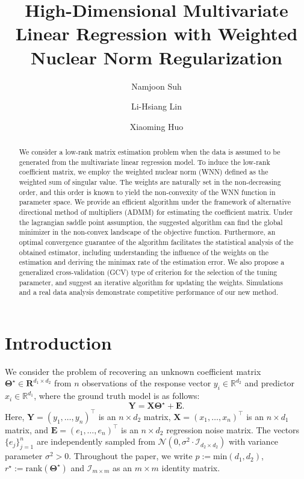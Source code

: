 \documentclass[alpha-refs]{wiley-article}
\title{High-Dimensional Multivariate Linear Regression with Weighted Nuclear Norm Regularization}
\author[1]{Namjoon Suh}
\author[2]{Li-Hsiang Lin}
\author[1]{Xiaoming Huo}
\affil[1]{H. Milton Stewart School of Industrial Systems and Engineering, Georgia Institute of Technology, Atlanta, Georgia, 30332, USA}
\affil[2]{Department of Experimental Statistics, Louisiana State University, Baton Rouge, Louisiana, 70803, USA}
\begin{document}
\maketitle

\begin{abstract}
We consider a low-rank matrix estimation problem when the data is assumed to be generated from the multivariate linear regression model.
To induce the low-rank coefficient matrix, we employ the weighted nuclear norm (WNN) defined as the weighted sum of singular value.
The weights are naturally set in the non-decreasing order, and this order is known to yield the non-convexity of the WNN function in parameter space.
We provide an efficient algorithm under the framework of alternative directional method of multipliers (ADMM) for estimating the coefficient matrix.
Under the lagrangian saddle point assumption, the suggested algorithm can find the global minimizer in the non-convex landscape of the objective function.
Furthermore, an optimal convergence guarantee of the algorithm facilitates the statistical analysis of the obtained estimator, including understanding the influence of the weights on the estimation and deriving the minimax rate of the estimation error. We also propose a generalized cross-validation (GCV) type of criterion for the selection of the tuning parameter, and suggest an iterative algorithm for updating the weights.
Simulations and a real data analysis demonstrate competitive performance of our new method.

\end{abstract}

\section{Introduction}
We consider the problem of recovering an unknown coefficient matrix $\boldsymbol{\Theta^\star}\in \boldsymbol{R}^{d_{1} \times d_{2}}$ from $n$ observations of the response vector $y_{i} \in \mathbb{R}^{d_{2}}$ and predictor $x_{i}\in\mathbb{R}^{d_{1}}$, where the ground truth model is as follows:
\begin{equation}
    \boldsymbol{Y} = \boldsymbol{X}\boldsymbol{\Theta}^{\star} + \boldsymbol{E}. \label{MVR}
\end{equation}
Here, $\boldsymbol{Y}=(y_{1},\dots,y_{n})^{\top}$ is an $n \times d_{2}$ matrix, $\boldsymbol{X}=(x_{1},\dots,x_{n})^{\top}$ is an $n \times d_{1}$ matrix, and $\boldsymbol{E}=(e_{1},\dots,e_{n})^{\top}$ is an $n \times d_{2}$ regression noise matrix.
The vectors $\{e_{j}\}_{j=1}^{n}$ are independently sampled from $\mathcal{N}(0,\sigma^{2} \cdot \mathcal{I}_{d_{2}\times d_{2}})$ with variance parameter $\sigma^{2}>0$.
Throughout the paper, we write $p:=\text{min}(d_{1},d_{2})$, $r^{\star}:=\text{rank}(\boldsymbol{\Theta}^{\star})$ and $\mathcal{I}_{m \times m}$ as an $m \times m$ identity matrix.
\end{document}
